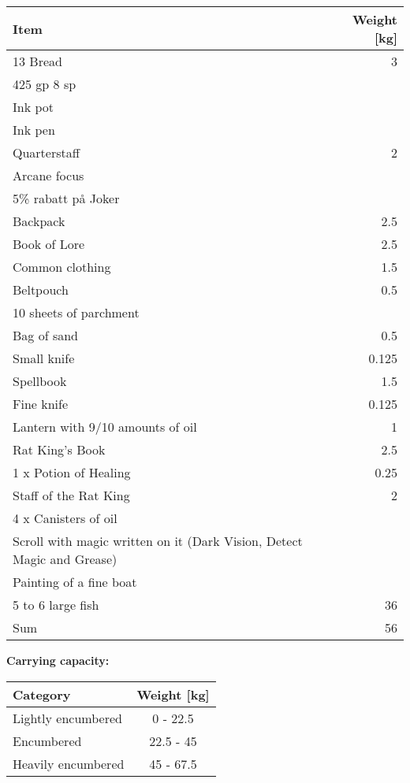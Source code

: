 \documentclass[11pt]{article}
\begin{document}
	\begin{tabularx}{\textwidth}{X|r}
Item & Weight [kg] \\
\hline
13 Bread \dotfill 							& 3 	\\
425 gp 8 sp									& 		\\
Ink pot 									& 		\\
Ink pen 									& 		\\
Quarterstaff \dotfill 						& 2 	\\
Arcane focus 								& 		\\
5\% rabatt på Joker 						& 		\\
Backpack \dotfill 							& 2.5 	\\
Book of Lore \dotfill 						& 2.5 	\\
Common clothing \dotfill 					& 1.5 	\\
Beltpouch \dotfill 							& 0.5 	\\
10 sheets of parchment 						& 		\\
Bag of sand \dotfill 						& 0.5 	\\
Small knife \dotfill 						& 0.125 \\
Spellbook \dotfill 							& 1.5 	\\
Fine knife \dotfill 						& 0.125	\\
Lantern with 9/10 amounts of oil \dotfill 	& 1 	\\
Rat King's Book \dotfill 					& 2.5 	\\
1 x Potion of Healing \dotfill				& 0.25	\\
Staff of the Rat King \dotfill				& 2		\\
4 x Canisters of oil						&		\\
Scroll with magic written on it	(Dark Vision, Detect Magic and Grease)			&		\\
Painting of a fine boat						&		\\
5 to 6 large fish \dotfill					& 36	\\
\hline
Sum 										& 56
	\end{tabularx}

\vspace{10mm}

\textbf{Carrying capacity:} \\

	\begin{tabular}{l|c}
Category & Weight [kg] \\
\hline
Lightly encumbered 	& 0 - 22.5 	\\
Encumbered 			& 22.5 - 45 \\
Heavily encumbered	& 45 - 67.5
	\end{tabular}
\end{document}
